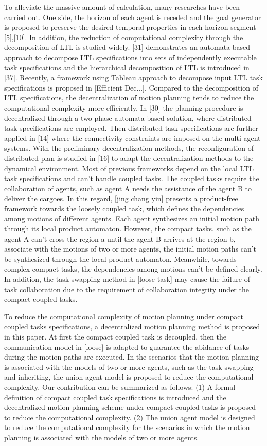 \documentclass[journal]{IEEEtran}
\begin{document}
To alleviate the massive amount of calculation, many researches have been carried out. One side, the horizon of each agent is receded and the goal generator is proposed to preserve the desired temporal properties in each horizon segment [5],[10]. In addition, the reduction of computational complexity through the decomposition of LTL is studied widely. [31] demonstrates an automata-based approach to decompose LTL specifications into sets of independently executable task specifications and the hierarchical decomposition of LTL is introduced in [37]. Recently, a framework using Tableau approach to decompose input LTL task specifications is proposed in [Efficient Dec...]. Compared to the decomposition of LTL specifications, the decentralization of motion planning tends to reduce the computational complexity more efficiently. In [30] the planning procedure is decentralized through a two-phase automata-based solution, where distributed task specifications are employed. Then distributed task specifications are further applied in [14] where the connectivity constraints are imposed on the multi-agent systems. With the preliminary decentralization methods, the reconfiguration of distributed plan is studied in [16] to adapt the decentralization methods to the dynamical environment. Most of previous frameworks depend on the local LTL task specifications and can't handle coupled tasks. The coupled tasks require the collaboration of agents, such as agent A needs the assistance of the agent B to deliver the cargoes. In this regard, [jing chang yin] presents a product-free framework towards the loosely coupled task, which defines the dependencies among motions of different agents. Each agent synthesizes an initial motion path through its local product automaton. However, the compact tasks, such as the agent A can't cross the region a until the agent B arrives at the region b, associate with the motions of two or more agents, the initial motion paths can't be synthesized through the local product automaton. Meanwhile, towards complex compact tasks, the dependencies among motions can't be defined clearly. In addition, the task swapping method in [loose task] may cause the failure of task collaboration due to the requirement of collaboration integrity under the compact coupled tasks.

To reduce the computational complexity of motion planning under compact coupled tasks specifications, a decentralized motion planning method is proposed in this paper. At first the compact coupled task is decoupled, then the communication model in [loose] is adapted to guarantee the abidance of tasks during the motion paths are executed. In the scenarios that the motion planning is associated with the models of two or more agents, such as the task swapping and inheriting, the union agent model is proposed to reduce the computational complexity. Our contribution can be summarized as follows: (1) A formal definition of compact coupled task specifications is introduced and the decentralized motion planning scheme under compact coupled tasks is proposed to reduce the computational complexity. (2) The union agent model is designed to reduce the computational complexity for the scenarios in which the motion planning is associated with the models of two or more agents.
\end{document}
